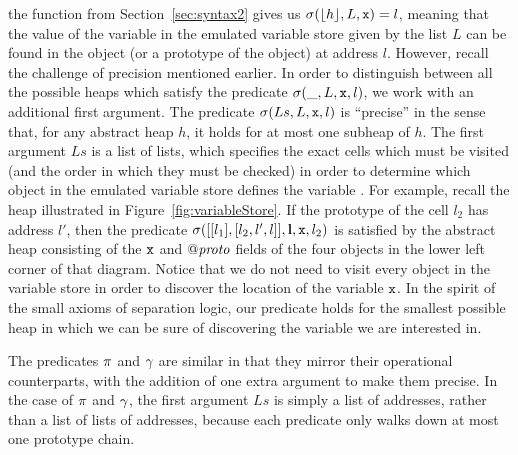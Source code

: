 \documentclass{article}
\begin{document}
the function from Section~\ref{sec:syntax2} gives us
$\sigma(\lfloor h\rfloor,L,\mbox{\texttt{{\upshape x}}})=l$, meaning that the value of the variable
 in the emulated variable store given by the list $L$ can be
found in the object (or a prototype of the object) at address $l$.
However, recall the challenge of precision mentioned earlier. In order
to distinguish between all the possible heaps which satisfy the
predicate $\sigma(\_,L,\mbox{\texttt{{\upshape x}}},l)$, we work with an additional first
argument. The predicate $\sigma(Ls,L,\mbox{\texttt{{\upshape x}}},l)$ is ``precise'' in the
sense that, for any abstract heap $h$, it holds for at most one
subheap of $h$. The first argument $Ls$ is a list of lists, which
specifies the exact cells which must be visited (and the order in
which they must be checked) in order to determine which object in the
emulated variable store defines the variable . For example,
recall the heap illustrated in Figure~\ref{fig:variableStore}. If the
prototype of the cell $l_2$ has address $l'$, then the predicate
$\sigma([[l_1],[l_2,l',l]],\textbf{l},\mbox{\texttt{{\upshape x}}},l_2)$ is satisfied by the
abstract heap consisting of the $\mbox{\texttt{{\upshape x}}}$ and $\mathit{@proto}$ fields of the
four objects in the lower left corner of that diagram. Notice that we
do not need to visit every object in the variable store in order to
discover the location of the variable $\mbox{\texttt{{\upshape x}}}$. In the spirit of the
small axioms of separation logic, our predicate holds for the smallest
possible heap in which we can be sure of discovering the variable we
are interested in.

The predicates $\pi$ and $\gamma$ are similar in that they
mirror their operational counterparts, with the addition of one extra
argument to make them precise. In the case of $\pi$ and $\gamma$,
the first argument $Ls$ is simply a list of addresses, rather than a list of
lists of addresses, because each predicate only walks down at
most one prototype chain.


\end{document}
